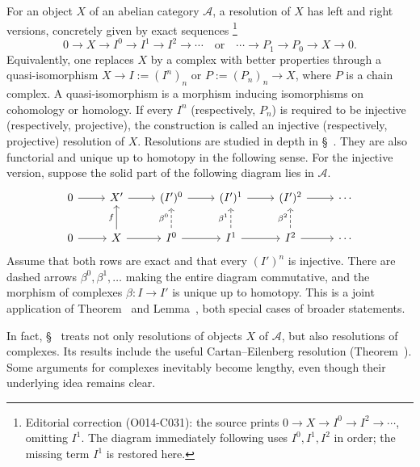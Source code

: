 For an object $X$ of an abelian category $\mathcal{A}$, a resolution of $X$
has left and right versions, concretely given by exact sequences%
\footnote{Editorial correction (O014-C031): the source prints
$0\to X\to I^0\to I^2\to\cdots$, omitting $I^1$. The diagram immediately
following uses $I^0,I^1,I^2$ in order; the missing term $I^1$ is restored here.}
\[
  0\to X\to I^0\to I^1\to I^2\to\cdots
  \quad\text{or}\quad
  \cdots\to P_1\to P_0\to X\to0 .
\]
Equivalently, one replaces $X$ by a complex with better properties through a
quasi-isomorphism $X\to I:=(I^n)_n$ or $P:=(P_n)_n\to X$, where $P$ is a
chain complex. A quasi-isomorphism is a morphism inducing isomorphisms on
cohomology or homology. If every $I^n$ (respectively, $P_n$) is required to
be injective (respectively, projective), the construction is called an
injective (respectively, projective) resolution of $X$. Resolutions are
studied in depth in \S~. They are also
functorial and unique up to homotopy in the following sense. For the
injective version, suppose the solid part of the following diagram lies in
$\mathcal{A}$.
\[
\begin{tikzcd}
	0 \arrow[r] & X' \arrow[r] & (I')^0 \arrow[r] & (I')^1 \arrow[r]
	  & (I')^2 \arrow[r] & \cdots \\
	0 \arrow[r] & X \arrow[u,"f"] \arrow[r]
	  & I^0 \arrow[dashed,u,"{\beta^0}"] \arrow[r]
	  & I^1 \arrow[r] \arrow[dashed,u,"{\beta^1}"]
	  & I^2 \arrow[r] \arrow[dashed,u,"{\beta^2}"] & \cdots
\end{tikzcd}
\]
Assume that both rows are exact and that every $(I')^n$ is injective. There
are dashed arrows $\beta^0,\beta^1,\ldots$ making the entire diagram
commutative, and the morphism of complexes $\beta:I\to I'$ is unique up to
homotopy. This is a joint application of
Theorem~ and
Lemma~, both special cases of
broader statements.

In fact, \S~ treats not only
resolutions of objects $X$ of $\mathcal{A}$, but also resolutions of
complexes. Its results include the useful Cartan--Eilenberg resolution
(Theorem~). Some arguments for
complexes inevitably become lengthy, even though their underlying idea
remains clear.


